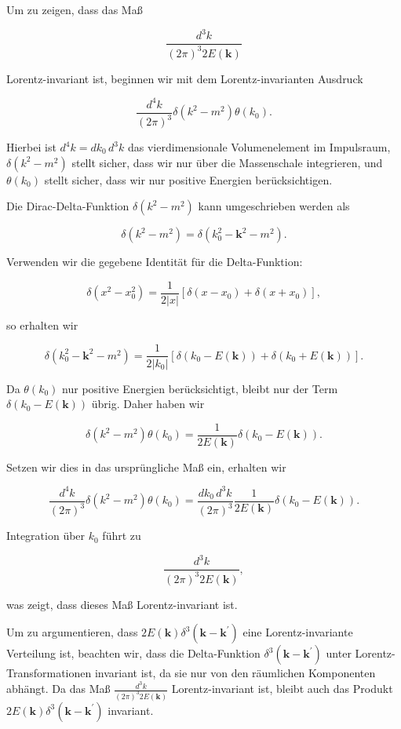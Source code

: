 Um zu zeigen, dass das Maß 

\[
\frac{d^3 k}{(2 \pi)^3 2 E(\mathbf{k})}
\]

Lorentz-invariant ist, beginnen wir mit dem Lorentz-invarianten Ausdruck 

\[
\frac{d^4 k}{(2 \pi)^3} \delta\left(k^2 - m^2\right) \theta\left(k_0\right).
\]

Hierbei ist $d^4 k = dk_0 \, d^3 k$ das vierdimensionale Volumenelement im Impulsraum, $\delta\left(k^2 - m^2\right)$ stellt sicher, dass wir nur über die Massenschale integrieren, und $\theta\left(k_0\right)$ stellt sicher, dass wir nur positive Energien berücksichtigen.

Die Dirac-Delta-Funktion $\delta\left(k^2 - m^2\right)$ kann umgeschrieben werden als 

\[
\delta\left(k^2 - m^2\right) = \delta\left(k_0^2 - \mathbf{k}^2 - m^2\right).
\]

Verwenden wir die gegebene Identität für die Delta-Funktion:

\[
\delta\left(x^2 - x_0^2\right) = \frac{1}{2|x|}\left[\delta\left(x - x_0\right) + \delta\left(x + x_0\right)\right],
\]

so erhalten wir

\[
\delta\left(k_0^2 - \mathbf{k}^2 - m^2\right) = \frac{1}{2|k_0|} \left[\delta\left(k_0 - E(\mathbf{k})\right) + \delta\left(k_0 + E(\mathbf{k})\right)\right].
\]

Da $\theta(k_0)$ nur positive Energien berücksichtigt, bleibt nur der Term $\delta\left(k_0 - E(\mathbf{k})\right)$ übrig. Daher haben wir

\[
\delta\left(k^2 - m^2\right) \theta\left(k_0\right) = \frac{1}{2E(\mathbf{k})} \delta\left(k_0 - E(\mathbf{k})\right).
\]

Setzen wir dies in das ursprüngliche Maß ein, erhalten wir

\[
\frac{d^4 k}{(2 \pi)^3} \delta\left(k^2 - m^2\right) \theta\left(k_0\right) = \frac{dk_0 \, d^3 k}{(2 \pi)^3} \frac{1}{2E(\mathbf{k})} \delta\left(k_0 - E(\mathbf{k})\right).
\]

Integration über $k_0$ führt zu

\[
\frac{d^3 k}{(2 \pi)^3 2E(\mathbf{k})},
\]

was zeigt, dass dieses Maß Lorentz-invariant ist.

Um zu argumentieren, dass $2 E(\mathbf{k}) \delta^3\left(\mathbf{k} - \mathbf{k}^{\prime}\right)$ eine Lorentz-invariante Verteilung ist, beachten wir, dass die Delta-Funktion $\delta^3\left(\mathbf{k} - \mathbf{k}^{\prime}\right)$ unter Lorentz-Transformationen invariant ist, da sie nur von den räumlichen Komponenten abhängt. Da das Maß $\frac{d^3 k}{(2 \pi)^3 2 E(\mathbf{k})}$ Lorentz-invariant ist, bleibt auch das Produkt $2 E(\mathbf{k}) \delta^3\left(\mathbf{k} - \mathbf{k}^{\prime}\right)$ invariant.